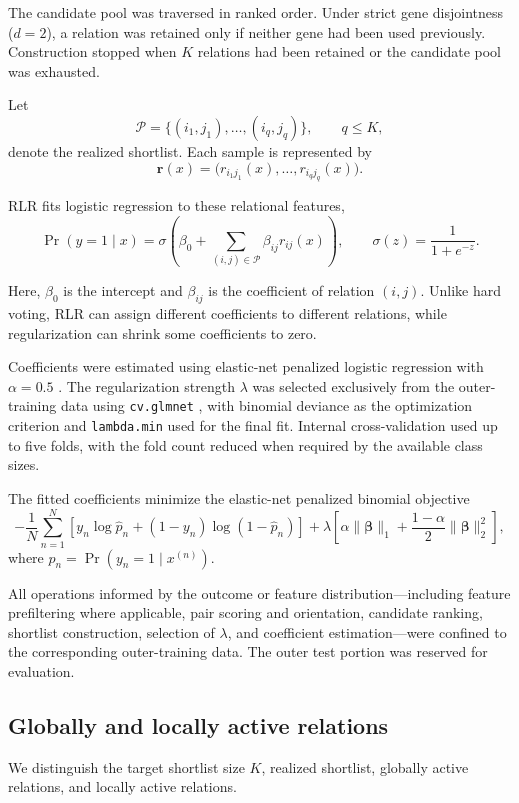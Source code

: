 \documentclass[preprint,12pt,a4paper]{elsarticle}
\begin{document}
The candidate pool was traversed in ranked order. Under strict gene disjointness ($d=2$), a relation was retained only if neither gene had been used previously. Construction stopped when $K$ relations had been retained or the candidate pool was exhausted.

Let
\[
\mathcal{P}=\{(i_1,j_1),\ldots,(i_q,j_q)\},
\qquad q\le K,
\]
denote the realized shortlist. Each sample is represented by
\[
\mathbf{r}(x)=
\big(r_{i_1j_1}(x),\ldots,r_{i_qj_q}(x)\big).
\]

RLR fits logistic regression to these relational features,
\[
\Pr(y=1\mid x)
=
\sigma\!\left(
\beta_0+
\sum_{(i,j)\in\mathcal{P}}
\beta_{ij}r_{ij}(x)
\right),
\qquad
\sigma(z)=\frac{1}{1+e^{-z}}.
\]

Here, $\beta_0$ is the intercept and $\beta_{ij}$ is the coefficient of relation $(i,j)$. Unlike hard voting, RLR can assign different coefficients to different relations, while regularization can shrink some coefficients to zero.

Coefficients were estimated using elastic-net penalized logistic regression with $\alpha=0.5$ \cite{ZouHastie2005}. The regularization strength $\lambda$ was selected exclusively from the outer-training data using \texttt{cv.glmnet} \cite{Friedman2010}, with binomial deviance as the optimization criterion and \texttt{lambda.min} used for the final fit. Internal cross-validation used up to five folds, with the fold count reduced when required by the available class sizes.

The fitted coefficients minimize the elastic-net penalized binomial objective
\[
-\frac{1}{N}\sum_{n=1}^{N}
\left[
y_n\log\hat p_n+
(1-y_n)\log(1-\hat p_n)
\right]
+
\lambda
\left[
\alpha\|\boldsymbol{\beta}\|_1+
\frac{1-\alpha}{2}\|\boldsymbol{\beta}\|_2^2
\right],
\]
where $\hat p_n=\Pr(y_n=1\mid x^{(n)})$.

All operations informed by the outcome or feature distribution---including feature prefiltering where applicable, pair scoring and orientation, candidate ranking, shortlist construction, selection of $\lambda$, and coefficient estimation---were confined to the corresponding outer-training data. The outer test portion was reserved for evaluation.
\subsection{Globally and locally active relations}

We distinguish the target shortlist size $K$, realized shortlist, globally active relations, and locally active relations.
\end{document}
